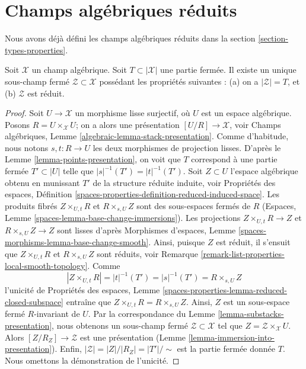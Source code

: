 \section{Champs algébriques réduits}
\label{section-reduced}

\noindent
Nous avons déjà défini les champs algébriques réduits dans la
section \ref{section-types-properties}.

\begin{lemma}
\label{lemma-reduced-closed-substack}
Soit $\mathcal{X}$ un champ algébrique.
Soit $T \subset |\mathcal{X}|$ une partie fermée.
Il existe un unique sous-champ fermé $\mathcal{Z} \subset \mathcal{X}$
possédant les propriétés suivantes :
(a) on a $|\mathcal{Z}| = T$, et (b) $\mathcal{Z}$ est réduit.
\end{lemma}

\begin{proof}
Soit $U \to \mathcal{X}$ un morphisme lisse surjectif, où $U$ est un
espace algébrique. Posons $R = U \times_\mathcal{X} U$; on a alors une
présentation $[U/R] \to \mathcal{X}$, voir
Champs algébriques, Lemme \ref{algebraic-lemma-stack-presentation}.
Comme d'habitude, nous notons $s, t : R \to U$ les deux morphismes de projection lisses.
D'après le Lemme \ref{lemma-points-presentation},
on voit que $T$ correspond à une partie fermée $T' \subset |U|$ telle
que $|s|^{-1}(T') = |t|^{-1}(T')$.
Soit $Z \subset U$ l'espace algébrique obtenu en munissant
$T'$ de la structure réduite induite, voir
Propriétés des espaces,
Définition \ref{spaces-properties-definition-reduced-induced-space}.
Les produits fibrés
$Z \times_{U, t} R$ et $R \times_{s, U} Z$ sont des sous-espaces fermés
de $R$
(Espaces, Lemme \ref{spaces-lemma-base-change-immersions}).
Les projections $Z \times_{U, t} R \to Z$ et
$R \times_{s, U} Z \to Z$ sont lisses d'après
Morphismes d'espaces, Lemme \ref{spaces-morphisms-lemma-base-change-smooth}.
Ainsi, puisque $Z$ est réduit, il s'ensuit que
$Z \times_{U, t} R$ et $R \times_{s, U} Z$ sont réduits, voir
Remarque \ref{remark-list-properties-local-smooth-topology}.
Comme
$$
|Z \times_{U, t} R| = |t|^{-1}(T') = |s|^{-1}(T') = R \times_{s, U} Z
$$
l'unicité de
Propriétés des espaces,
Lemme \ref{spaces-properties-lemma-reduced-closed-subspace}
entraîne que $Z \times_{U, t} R = R \times_{s, U} Z$.
Ainsi, $Z$ est un sous-espace fermé $R$-invariant de $U$.
Par la correspondance du
Lemme \ref{lemma-substacks-presentation},
nous obtenons un sous-champ fermé $\mathcal{Z} \subset \mathcal{X}$
tel que $Z = \mathcal{Z} \times_\mathcal{X} U$. Alors
$[Z/R_Z] \to \mathcal{Z}$ est une présentation
(Lemme \ref{lemma-immersion-into-presentation}).
Enfin, $|\mathcal{Z}| = |Z|/|R_Z| = |T'|/\sim$ est la
partie fermée donnée $T$. Nous omettons la démonstration de l'unicité.
\end{proof}

